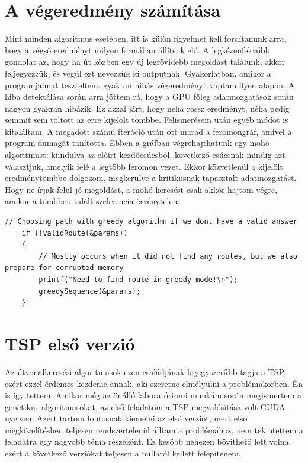 \section{A végeredmény számítása}
\label{sec:getResult}
Mint minden algoritmus esetében, itt is külön figyelmet kell fordítanunk arra, hogy a végső eredményt milyen formában állítsuk elő. A legkézenfekvőbb gondolat az, hogy ha út közben egy új legrövidebb megoldást találunk, akkor feljegyezzük, és végül ezt nevezzük ki outputnak. Gyakorlatban, amikor a programjaimat teszteltem, gyakran hibás végeredményt kaptam ilyen alapon. A hiba detektálása során arra jöttem rá, hogy a GPU főleg adatmozgatások során nagyon gyakran hibázik. Ez azzal járt, hogy néha rossz eredményt, néha pedig semmit sem töltött az erre kijelölt tömbbe. Felismerésem után egyéb módot is kitaláltam. A megadott számú iteráció után ott marad a feromongráf, amivel a program önmagát tanította. Ebben a gráfban végrehajthatunk egy mohó algoritmust: kiindulva az előírt kezdőcsúcsból, következő csúcsnak mindig azt választjuk, amelyik felé a legtöbb feromon vezet. Ekkor közvetlenül a kijelölt eredménytömbbe dolgozom, megkerülve a kritikusnak tapasztalt adatmozgatást. Hogy ne írjak felül jó megoldást, a mohó keresést csak akkor hajtom végre, amikor a tömbben talált szekvencia érvénytelen.

\begin{lstlisting}[style=CStyle,showstringspaces=false]
	// Choosing path with greedy algorithm if we dont have a valid answer
	if (!validRoute(&params)) 
	{
		// Mostly occurs when it did not find any routes, but we also prepare for corrupted memory
		printf("Need to find route in greedy mode!\n");
		greedySequence(&params);
	}
\end{lstlisting}


\section{TSP első verzió} \label{TSP_v1_SubSection}
Az útvonalkeresési algoritmusok ezen családjának legegyszerűbb tagja a TSP, ezért ezzel érdemes kezdenie annak, aki szeretne elmélyülni a problémakörben. Én is így tettem. Amikor még az önálló laboratóriumi munkám során megismertem a genetikus algoritmusokat, az első feladatom a TSP megvalósítása volt CUDA nyelven. Azért tartom fontosnak kiemelni az első verziót, mert első megközelítésben teljesen rendszertelenül álltam a problémához, nem tekintettem a feladatra egy nagyobb téma részeként. Ez később nehezen bővithető lett volna, ezért a következő verziókat teljesen a nulláról kellett felépítenem.

